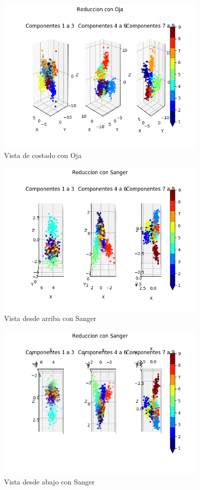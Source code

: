 \begin{figure}[H]
  \includegraphics[width=0.9\textwidth]{imagenes/componentes_oja_3.png}
  \caption{Vista de costado con Oja}
\end{figure}

\begin{figure}[H]
  \includegraphics[width=0.9\textwidth]{imagenes/componentes_sanger_1.png}
  \caption{Vista desde arriba con Sanger}
\end{figure}

\begin{figure}[H]
  \includegraphics[width=0.9\textwidth]{imagenes/componentes_sanger_2.png}
  \caption{Vista desde abajo con Sanger}
\end{figure}

